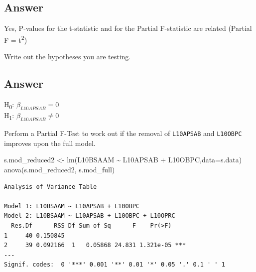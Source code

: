 \documentclass[
  10pt,
  letterpaper,
  DIV=11,
  numbers=noendperiod]{scrartcl}
\newenvironment{Shaded}{\begin{snugshade}}{\end{snugshade}}
\newcommand{\AttributeTok}[1]{\textcolor[rgb]{0.40,0.45,0.13}{#1}}
\newcommand{\FunctionTok}[1]{\textcolor[rgb]{0.28,0.35,0.67}{#1}}
\newcommand{\NormalTok}[1]{\textcolor[rgb]{0.00,0.23,0.31}{#1}}
\newcommand{\OtherTok}[1]{\textcolor[rgb]{0.00,0.23,0.31}{#1}}
\newcommand{\SpecialCharTok}[1]{\textcolor[rgb]{0.37,0.37,0.37}{#1}}
\begin{document}
\hypertarget{answer-14}{%
\subsection{Answer}\label{answer-14}}

Yes, P-values for the t-statistic and for the Partial F-statistic are
related (Partial F = t\textsuperscript{2})

\begin{tcolorbox}[enhanced jigsaw, rightrule=.15mm, coltitle=black, leftrule=.75mm, titlerule=0mm, breakable, toprule=.15mm, bottomtitle=1mm, colback=white, toptitle=1mm, opacitybacktitle=0.6, bottomrule=.15mm, arc=.35mm, left=2mm, title=\textcolor{quarto-callout-warning-color}{\faExclamationTriangle}\hspace{0.5em}{Question 3}, colbacktitle=quarto-callout-warning-color!10!white, opacityback=0, colframe=quarto-callout-warning-color-frame]

Write out the hypotheses you are testing.

\end{tcolorbox}

\hypertarget{answer-15}{%
\subsection{Answer}\label{answer-15}}

H\textsubscript{0}: \(\beta_{L10APSAB} = 0\)\\
H\textsubscript{1}: \(\beta_{L10APSAB} \neq 0\)

Perform a Partial F-Test to work out if the removal of \texttt{L10APSAB}
and \texttt{L10OBPC} improves upon the full model.

\begin{Shaded}
\begin{Highlighting}[]
\NormalTok{s.mod\_reduced2  }\OtherTok{\textless{}{-}} \FunctionTok{lm}\NormalTok{(L10BSAAM }\SpecialCharTok{\textasciitilde{}}\NormalTok{ L10APSAB }\SpecialCharTok{+}\NormalTok{ L10OBPC,}\AttributeTok{data=}\NormalTok{s.data)}
\FunctionTok{anova}\NormalTok{(s.mod\_reduced2, s.mod\_full)}
\end{Highlighting}
\end{Shaded}

\begin{verbatim}
Analysis of Variance Table

Model 1: L10BSAAM ~ L10APSAB + L10OBPC
Model 2: L10BSAAM ~ L10APSAB + L10OBPC + L10OPRC
  Res.Df      RSS Df Sum of Sq      F    Pr(>F)    
1     40 0.150845                                  
2     39 0.092166  1   0.05868 24.831 1.321e-05 ***
---
Signif. codes:  0 '***' 0.001 '**' 0.01 '*' 0.05 '.' 0.1 ' ' 1
\end{verbatim}
\end{document}

